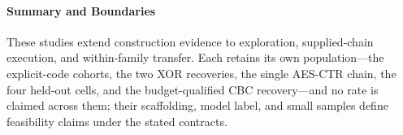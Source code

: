 \paragraph{Summary and Boundaries}\label{sec:adaptsum}
These studies extend construction evidence to exploration, supplied-chain
execution, and within-family transfer. Each retains its own population---the
explicit-code cohorts, the two XOR recoveries, the single AES-CTR chain, the
four held-out cells, and the budget-qualified CBC recovery---and no rate is
claimed across them; their scaffolding, model label, and small samples define
feasibility claims under the stated contracts.

